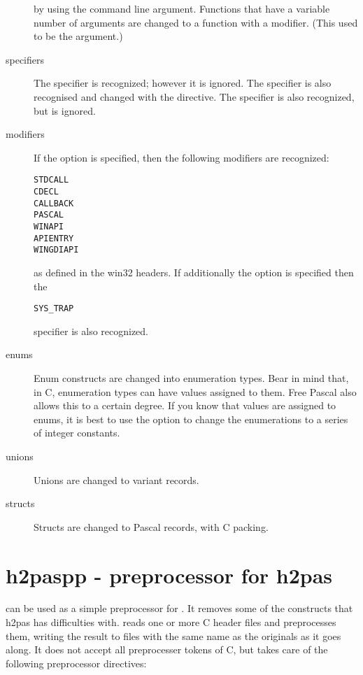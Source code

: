 \begin{description}
by using the  command line argument. Functions that have a 
variable number of arguments are changed to a function with a 
modifier. (This used to be the  argument.)
\item[specifiers]
The  specifier is recognized; however it is ignored. 
The  specifier is also recognised and changed with the
 directive. The  specifier is also 
recognized, but is ignored.
\item[modifiers] 
If the  option is specified, then the following modifiers are recognized:
\begin{verbatim}
STDCALL
CDECL
CALLBACK
PASCAL
WINAPI
APIENTRY
WINGDIAPI
\end{verbatim}
as defined in the win32 headers. If additionally the 
option is specified then the  
\begin{verbatim}
SYS_TRAP
\end{verbatim}
specifier is also recognized.
\item[enums]
Enum constructs are changed into enumeration types. Bear in mind that, in C,
enumeration types can have values assigned to them. Free Pascal also allows
this to a certain degree. If you know that values are assigned to enums, it
is best to use the  option to change the enumerations to a series of 
integer  constants.

\item[unions] Unions are changed to variant records. 
\item[structs] Structs are changed to Pascal records, with C packing.
\end{description}

\section{h2paspp - preprocessor for h2pas}
 can be used as a simple preprocessor for . It
removes some of the constructs that h2pas has difficulties with. 
 reads one or more C header files and preprocesses them, writing the result 
to files with the same name as the originals as it goes along. 
It does not accept all preprocesser tokens of C, but takes care of the following 
preprocessor directives:

